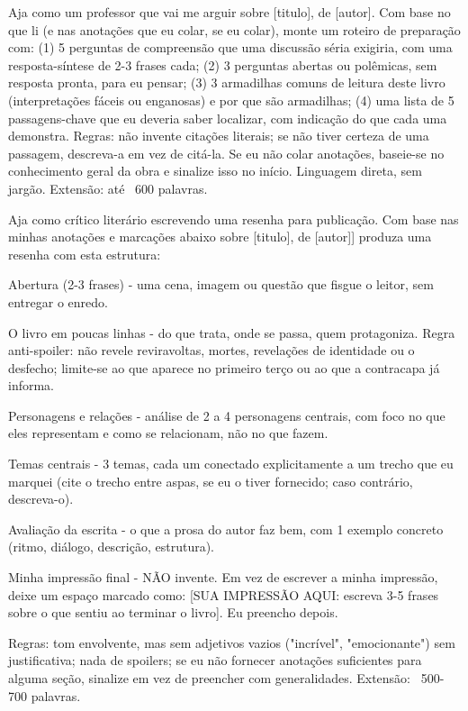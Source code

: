 \documentclass[11pt, a4paper]{article}
\begin{document}
\begin{promptbox}
Aja como um professor que vai me arguir sobre [titulo], de [autor]. Com base no que li (e nas anotações que eu colar, se eu colar), monte um roteiro de preparação com: (1) 5 perguntas de compreensão que uma discussão séria exigiria, com uma resposta-síntese de 2-3 frases cada; (2) 3 perguntas abertas ou polêmicas, sem resposta pronta, para eu pensar; (3) 3 armadilhas comuns de leitura deste livro (interpretações fáceis ou enganosas) e por que são armadilhas; (4) uma lista de 5 passagens-chave que eu deveria saber localizar, com indicação do que cada uma demonstra. Regras: não invente citações literais; se não tiver certeza de uma passagem, descreva-a em vez de citá-la. Se eu não colar anotações, baseie-se no conhecimento geral da obra e sinalize isso no início. Linguagem direta, sem jargão. Extensão: até ~600 palavras.
\end{promptbox}

\begin{promptbox}
Aja como crítico literário escrevendo uma resenha para publicação. Com base nas minhas anotações e marcações abaixo sobre [titulo], de [autor]] produza uma resenha com esta estrutura:

Abertura (2-3 frases) - uma cena, imagem ou questão que fisgue o leitor, sem entregar o enredo.

O livro em poucas linhas - do que trata, onde se passa, quem protagoniza. Regra anti-spoiler: não revele reviravoltas, mortes, revelações de identidade ou o desfecho; limite-se ao que aparece no primeiro terço ou ao que a contracapa já informa.

Personagens e relações - análise de 2 a 4 personagens centrais, com foco no que eles representam e como se relacionam, não no que fazem.

Temas centrais - 3 temas, cada um conectado explicitamente a um trecho que eu marquei (cite o trecho entre aspas, se eu o tiver fornecido; caso contrário, descreva-o).

Avaliação da escrita - o que a prosa do autor faz bem, com 1 exemplo concreto (ritmo, diálogo, descrição, estrutura).

Minha impressão final - NÃO invente. Em vez de escrever a minha impressão, deixe um espaço marcado como: [SUA IMPRESSÃO AQUI: escreva 3-5 frases sobre o que sentiu ao terminar o livro]. Eu preencho depois.

Regras: tom envolvente, mas sem adjetivos vazios ("incrível", "emocionante") sem justificativa; nada de spoilers; se eu não fornecer anotações suficientes para alguma seção, sinalize em vez de preencher com generalidades. Extensão: ~500-700 palavras.
\end{promptbox}
\end{document}
